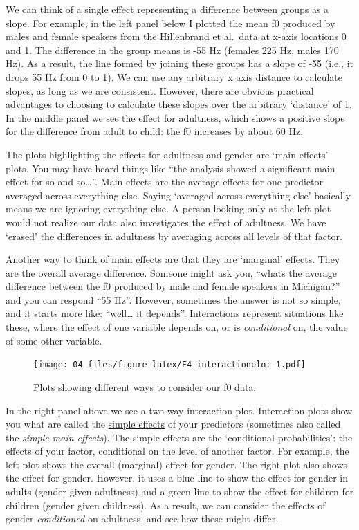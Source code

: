 \documentclass[
]{book}
\begin{document}
We can think of a single effect representing a difference between groups as a slope. For example, in the left panel below I plotted the mean f0 produced by males and female speakers from the Hillenbrand et al.~data at x-axis locations 0 and 1. The difference in the group means is -55 Hz (females 225 Hz, males 170 Hz). As a result, the line formed by joining these groups has a slope of -55 (i.e., it drops 55 Hz from 0 to 1). We can use any arbitrary x axis distance to calculate slopes, as long as we are consistent. However, there are obvious practical advantages to choosing to calculate these slopes over the arbitrary `distance' of 1. In the middle panel we see the effect for adultness, which shows a positive slope for the difference from adult to child: the f0 increases by about 60 Hz.

The plots highlighting the effects for adultness and gender are `main effects' plots. You may have heard things like ``the analysis showed a significant main effect for so and so\ldots{}''. Main effects are the average effects for one predictor averaged across everything else. Saying `averaged across everything else' basically means we are ignoring everything else. A person looking only at the left plot would not realize our data also investigates the effect of adultness. We have `erased' the differences in adultness by averaging across all levels of that factor.

Another way to think of main effects are that they are `marginal' effects. They are the overall average difference. Someone might ask you, ``whats the average difference between the f0 produced by male and female speakers in Michigan?'' and you can respond ``55 Hz''. However, sometimes the answer is not so simple, and it starts more like: ``well\ldots{} it depends''. Interactions represent situations like these, where the effect of one variable depends on, or is \emph{conditional} on, the value of some other variable.

\begin{figure}
\centering
\texttt{[image: 04\_files/figure-latex/F4-interactionplot-1.pdf]}
\caption{\label{fig:F4-interactionplot}Plots showing different ways to consider our f0 data.}
\end{figure}

In the right panel above we see a two-way interaction plot. Interaction plots show you what are called the \href{http://glimo.vub.ac.be/downloads/simpleeffect.htm}{simple effects} of your predictors (sometimes also called the \emph{simple main effects}). The simple effects are the `conditional probabilities': the effects of your factor, conditional on the level of another factor. For example, the left plot shows the overall (marginal) effect for gender. The right plot also shows the effect for gender. However, it uses a blue line to show the effect for gender in adults (gender given adultness) and a green line to show the effect for children for children (gender given childness). As a result, we can consider the effects of gender \emph{conditioned} on adultness, and see how these might differ.
\end{document}
